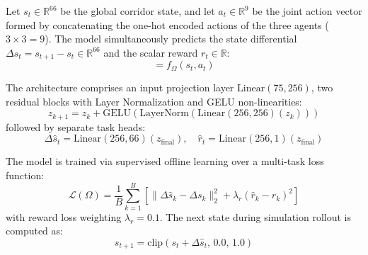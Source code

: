 \documentclass[12pt,a4paper,oneside]{report}
\begin{document}
Let $s_t \in \mathbb{R}^{66}$ be the global corridor state, and let $a_t \in \mathbb{R}^9$ be the joint action vector formed by concatenating the one-hot encoded actions of the three agents ($3 \times 3 = 9$). The model simultaneously predicts the state differential $\Delta s_t = s_{t+1} - s_t \in \mathbb{R}^{66}$ and the scalar reward $r_t \in \mathbb{R}$:
\begin{equation}
[\Delta \hat{s}_t, \, \hat{r}_t] = f_\Omega(s_t, a_t)
\end{equation}

The architecture comprises an input projection layer $\text{Linear}(75, 256)$, two residual blocks with Layer Normalization and GELU non-linearities:
\begin{equation}
z_{k+1} = z_k + \text{GELU}(\text{LayerNorm}(\text{Linear}(256, 256)(z_k)))
\end{equation}
followed by separate task heads:
\begin{equation}
\Delta \hat{s}_t = \text{Linear}(256, 66)(z_{\text{final}}), \quad \hat{r}_t = \text{Linear}(256, 1)(z_{\text{final}})
\end{equation}

The model is trained via supervised offline learning over a multi-task loss function:
\begin{equation}
\mathcal{L}(\Omega) = \frac{1}{B} \sum_{k=1}^B \left[ \|\Delta \hat{s}_k - \Delta s_k\|_2^2 + \lambda_r (\hat{r}_k - r_k)^2 \right]
\end{equation}
with reward loss weighting $\lambda_r = 0.1$. The next state during simulation rollout is computed as:
\begin{equation}
s_{t+1} = \text{clip}(s_t + \Delta \hat{s}_t, \, 0.0, \, 1.0)
\end{equation}
\end{document}
